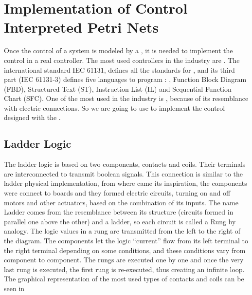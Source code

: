 \usetikzlibrary{arrows,shapes,circuits.plc.ladder,external}

\section{Implementation of Control Interpreted Petri Nets}
\label{sec:implementPetriNets}
Once the control of a system is modeled by a \CIPN, it
is needed to implement the control in a real controller. The most used
controllers in the industry are \PLCs. The international standard IEC 61131,
defines all the standards for \PLCs, and its third part (IEC 61131-3) defines
five languages to program \PLCs: \LD, Function Block Diagram
(FBD),  Structured Text (ST), Instruction List (IL) and Sequential Function
Chart (SFC). One of the most used in the industry is \LD, because of its
resemblance with electric connections. So we are going to use \LD{} to implement the
control designed with the \CIPN.

\subsection{Ladder Logic}
\label{sec:ladder}

The ladder logic is based on two components, contacts and coils. Their terminals are
interconnected to transmit boolean signals. This connection is similar to the
ladder physical implementation, from where came its inspiration, the components
were connect to boards and they formed electric circuits, turning on and off
motors and other actuators, based on the combination of its inputs. The name
Ladder comes from the resemblance between its structure (circuits formed in
parallel one above the other) and a ladder, so each circuit is called a Rung by analogy. The logic
values in a \LD{} rung
are transmitted from the left to the right of the diagram. The components let
the logic ``current'' flow from its left terminal to the right terminal
depending on some conditions, and these conditions vary from component to
component.
The rungs are executed one by one and once the very last rung is executed,
the first rung is re-executed, thus creating an infinite loop. 
 The graphical representation of the most used types of contacts and coils
can be seen in 

\newlength{\ladderskip}
\newlength{\ladderrungsep}

